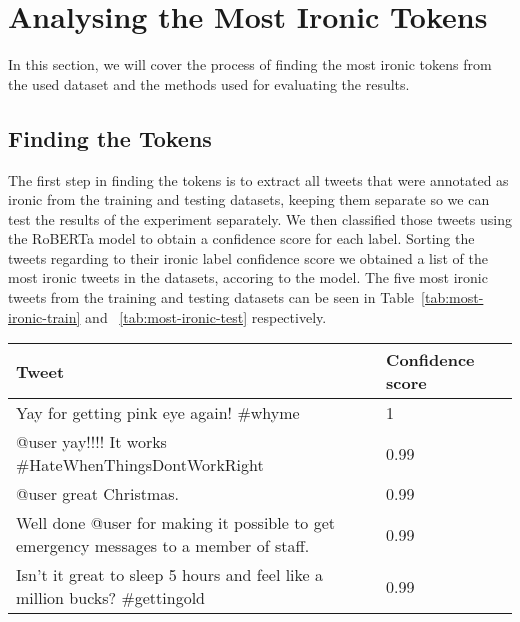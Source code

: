 \documentclass[10pt, a4paper]{article}
\begin{document}
\section{Analysing the Most Ironic Tokens}

In this section, we will cover the process of finding the most ironic tokens from the used dataset and the methods used for evaluating the results.

\subsection{Finding the Tokens}

The first step in finding the tokens is to extract all tweets that were annotated as ironic from the training and testing datasets, keeping them separate so we can test the results of the experiment separately.
We then classified those tweets using the RoBERTa model to obtain a confidence score for each label.
Sorting the tweets regarding to their ironic label confidence score we obtained a list of the most ironic tweets in the datasets, accoring to the model.
The five most ironic tweets from the training and testing datasets can be seen in Table~\ref{tab:most-ironic-train} and ~\ref{tab:most-ironic-test} respectively.

\begin{table*}
\caption{Most Ironic Tweets in the Training Set}
\label{tab:most-ironic-train}
\begin{center}
\begin{tabular}{llr}
\toprule
Tweet & Confidence score\\
\midrule
Yay for getting pink eye again!  \#whyme                                                & 1 \\
@user yay!!!! It works  \#HateWhenThingsDontWorkRight                                   & 0.99 \\
@user great Christmas.                                                                  & 0.99 \\
Well done @user for making it possible to get emergency messages to a member of staff.  & 0.99 \\
Isn't it great to sleep 5 hours and feel like a million bucks?  \#gettingold            & 0.99 \\
\bottomrule
\end{tabular}
\end{center}
\end{table*}
\end{document}
